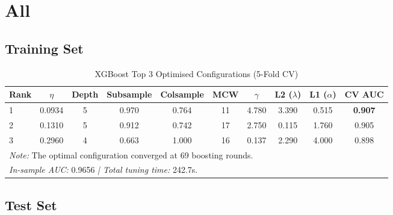 \documentclass{report}\usepackage[]{graphicx}\usepackage[]{xcolor}
\begin{document}

\section{All}

\subsection{Training Set}

\begin{table}[H]
    \centering
    \caption{XGBoost Top 3 Optimised Configurations (5-Fold CV)}
    \label{tab:xgb_leaderboard_v4}
    \begin{tabular}{lccccccccc}
        \hline
        \textbf{Rank} & \textbf{$\eta$} & \textbf{Depth} & \textbf{Subsample} & \textbf{Colsample} & \textbf{MCW} & \textbf{$\gamma$} & \textbf{L2 ($\lambda$)} & \textbf{L1 ($\alpha$)} & \textbf{CV AUC} \\
        \hline
        1 & 0.0934 & 5 & 0.970 & 0.764 & 11 & 4.780 & 3.390 & 0.515 & \textbf{0.907} \\
        2 & 0.1310 & 5 & 0.912 & 0.742 & 17 & 2.750 & 0.115 & 1.760 & 0.905 \\
        3 & 0.2960 & 4 & 0.663 & 1.000 & 16 & 0.137 & 2.290 & 4.000 & 0.898 \\
        \hline
        \multicolumn{10}{l}{\footnotesize \textit{Note:} The optimal configuration converged at 69 boosting rounds.} \\
        \multicolumn{10}{l}{\footnotesize \textit{In-sample AUC:} 0.9656 \textit{ | Total tuning time:} 242.7s.} \\
    \end{tabular}
\end{table}


\subsection{Test Set}
\end{document}
